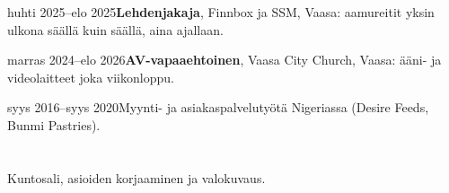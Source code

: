 \documentclass[a4paper,11pt]{article}
\begin{document}
\begin{cventry}{huhti 2025--elo 2025}{\textbf{Lehdenjakaja}, Finnbox ja SSM, Vaasa: aamureitit yksin ulkona säällä kuin säällä, aina ajallaan.}
\end{cventry}
\begin{cventry}{marras 2024--elo 2026}{\textbf{AV-vapaaehtoinen}, Vaasa City Church, Vaasa: ääni- ja videolaitteet joka viikonloppu.}
\end{cventry}
\begin{cventry}{syys 2016--syys 2020}{Myynti- ja asiakaspalvelutyötä Nigeriassa (Desire Feeds, Bunmi Pastries).}
\end{cventry}

\section{}
Kuntosali, asioiden korjaaminen ja valokuvaus.

\section{}
\end{document}
